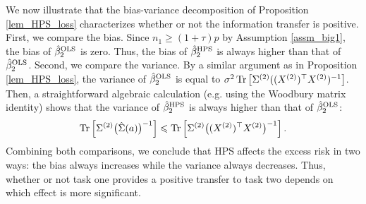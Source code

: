 





We now illustrate that the bias-variance decomposition of Proposition \ref{lem_HPS_loss} characterizes whether or not the information transfer is positive.
First, we compare the bias. Since $n_1 \ge (1 + \tau) p$ by Assumption \ref{assm_big1}, the bias of $\hat{\beta}_2^{\textup{OLS}}$ is zero.
Thus, the bias of $\hat{\beta}_2^{\textup{HPS}}$ is always higher than that of $\hat{\beta}_2^{\textup{OLS}}$.
Second, we compare the variance. By a similar argument as in Proposition \ref{lem_HPS_loss}, the variance of $\hat{\beta}_2^{\textup{OLS}}$ is equal to $\sigma^2 \operatorname{Tr}\left[\Sigma^{(2)} ((X^{(2)})^{\top} X^{(2)})^{-1}\right]$.
Then, a straightforward algebraic calculation (e.g. using the Woodbury matrix identity) shows that the variance of $\hat{\beta}_2^{\textup{HPS}}$ is always higher than that of $\hat{\beta}_2^{\textup{OLS}}$:
\begin{align*}
    \operatorname{Tr}\left[\Sigma^{(2)} \big(\hat{\Sigma}(a)\big)^{-1}\right] \leqslant \operatorname{Tr}\left[\Sigma^{(2)} \big((X^{(2)})^{\top} X^{(2)}\big)^{-1}\right].
\end{align*}
Combining both comparisons, we conclude that HPS affects the excess risk in two ways: the bias always increases while the variance always decreases.
Thus, whether or not task one provides a positive transfer to task two depends on which effect is more significant.





